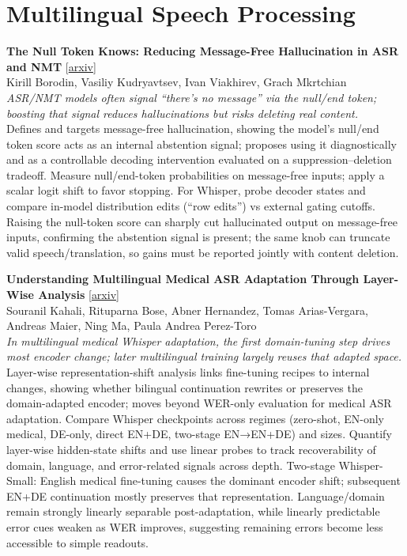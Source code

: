 \documentclass[12pt,letterpaper]{article}
\begin{document}
\medskip


\section*{Multilingual Speech Processing}

{\small\textbf{The Null Token Knows: Reducing Message-Free Hallucination in ASR and NMT}} {\scriptsize[\href{https://arxiv.org/abs/2608.15940}{arxiv}]}\\
{\scriptsize Kirill Borodin, Vasiliy Kudryavtsev, Ivan Viakhirev, Grach Mkrtchian}\\

{\small\textit{ASR/NMT models often signal ``there's no message'' via the null/end token; boosting that signal reduces hallucinations but risks deleting real content.}}\\[1pt]
{\footnotesize Defines and targets message-free hallucination, showing the model's null/end token score acts as an internal abstention signal; proposes using it diagnostically and as a controllable decoding intervention evaluated on a suppression--deletion tradeoff. Measure null/end-token probabilities on message-free inputs; apply a scalar logit shift to favor stopping. For Whisper, probe decoder states and compare in-model distribution edits (``row edits'') vs external gating cutoffs. Raising the null-token score can sharply cut hallucinated output on message-free inputs, confirming the abstention signal is present; the same knob can truncate valid speech/translation, so gains must be reported jointly with content deletion.}

\medskip

{\small\textbf{Understanding Multilingual Medical ASR Adaptation Through Layer-Wise Analysis}} {\scriptsize[\href{https://arxiv.org/abs/2608.18825}{arxiv}]}\\
{\scriptsize Souranil Kahali, Rituparna Bose, Abner Hernandez, Tomas Arias-Vergara, Andreas Maier, Ning Ma, Paula Andrea Perez-Toro}\\

{\small\textit{In multilingual medical Whisper adaptation, the first domain-tuning step drives most encoder change; later multilingual training largely reuses that adapted space.}}\\[1pt]
{\footnotesize Layer-wise representation-shift analysis links fine-tuning recipes to internal changes, showing whether bilingual continuation rewrites or preserves the domain-adapted encoder; moves beyond WER-only evaluation for medical ASR adaptation. Compare Whisper checkpoints across regimes (zero-shot, EN-only medical, DE-only, direct EN+DE, two-stage EN→EN+DE) and sizes. Quantify layer-wise hidden-state shifts and use linear probes to track recoverability of domain, language, and error-related signals across depth. Two-stage Whisper-Small: English medical fine-tuning causes the dominant encoder shift; subsequent EN+DE continuation mostly preserves that representation. Language/domain remain strongly linearly separable post-adaptation, while linearly predictable error cues weaken as WER improves, suggesting remaining errors become less accessible to simple readouts.}
\end{document}
